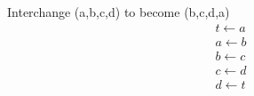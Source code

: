 \documentclass{article}
\begin{document}
Interchange (a,b,c,d) to become (b,c,d,a)\\
$$
\begin{aligned}
t \leftarrow a\\
a \leftarrow b\\
b \leftarrow c\\
c \leftarrow d\\
d \leftarrow t
\end{aligned}
$$
\end{document}
